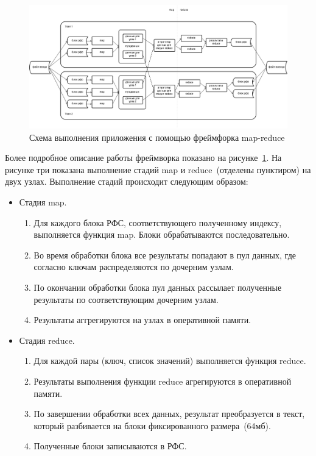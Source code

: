 \documentclass[12pt,a4paper,oneside]{extarticle}
\begin{document}
        \begin{figure}
            \centering
            \includegraphics[scale=0.55]{map_reduce_framework.png}
            \caption{Схема выполнения приложения с помощью фреймфорка map-reduce}
            \label{pic:mr_framework}
        \end{figure}

        Более подробное описание работы фреймворка показано на рисунке~\ref{pic:mr_framework}. На рисунке три показана выполнение стадий map и reduce~(отделены пунктиром) на двух узлах. Выполнение стадий происходит следующим образом:
        \begin{itemize}
            \item Стадия map.
            \begin{enumerate}
                \item Для каждого блока РФС, соответствующего полученному индексу, выполняется функция map. Блоки обрабатываются последовательно.
                \item Во время обработки блока все результаты попадают в пул данных, где согласно ключам распределяются по дочерним узлам.
                \item По окончании обработки блока пул данных рассылает полученные результаты по соответствующим дочерним узлам.
                \item Результаты аггрегируются на узлах в оперативной памяти.
            \end{enumerate}
            \item Стадия reduce.
            \begin{enumerate}
                \item Для каждой пары (ключ, список значений) выполняется функция reduce.
                \item Результаты выполнения функции reduce агрегируются в оперативной памяти.
                \item По завершении обработки всех данных, результат преобразуется в текст, который разбивается на блоки фиксированного размера~(64мб).
                \item Полученные блоки записываются в РФС.
            \end{enumerate}
        \end{itemize}
        
\end{document}
